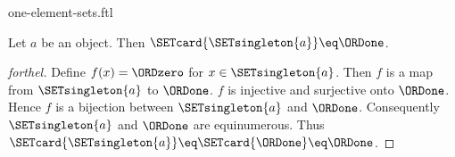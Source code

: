 \documentclass{stex}
\begin{document}
\begin{smodule}{one-element-sets.ftl}

\begin{proposition}[forthel,id=SET_THEORY_07_836893598023680]
  Let $a$ be an object.
  Then $\SETcard{\SETsingleton{a}} \eq \ORDone$.
\end{proposition}
\begin{proof}[forthel]
  Define $f(x) = \ORDzero$ for $x \in \SETsingleton{a}$.
  Then $f$ is a map from $\SETsingleton{a}$ to $\ORDone$.
  $f$ is injective and surjective onto $\ORDone$.
  Hence $f$ is a bijection between $\SETsingleton{a}$ and $\ORDone$.
  Consequently $\SETsingleton{a}$ and $\ORDone$ are equinumerous.
  Thus $\SETcard{\SETsingleton{a}} \eq \SETcard{\ORDone} \eq \ORDone$.
\end{proof}
\end{smodule}
\end{document}
